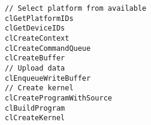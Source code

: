 \lstset{language=C++}
\begin{lstlisting}
// Select platform from available
clGetPlatformIDs
clGetDeviceIDs
clCreateContext
clCreateCommandQueue
clCreateBuffer
// Upload data
clEnqueueWriteBuffer
// Create kernel
clCreateProgramWithSource
clBuildProgram
clCreateKernel
\end{lstlisting}